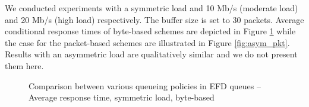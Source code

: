 \documentclass[preprint,12pt]{elsarticle}
\begin{document}
We conducted experiments with a symmetric load and 10 Mb/s (moderate load) and 20 Mb/s (high load) respectively. The buffer size is set to 30 packets. Average conditional response times of byte-based schemes are depicted in Figure \ref{fig:asym_byte} while the case for the packet-based schemes are illustrated in Figure \ref{fig:asym_pkt}. Results with an asymmetric load are qualitatively similar and we do not present them here.

\begin{figure}[ht!]
  \centering
  \caption{Comparison between various queueing policies in EFD  queues -- Average response time, symmetric load, byte-based}
  \label{fig:asym_byte}
\end{figure}
\end{document}
